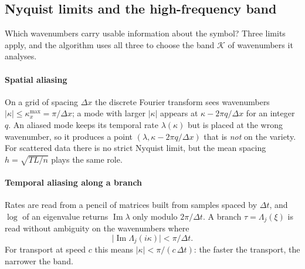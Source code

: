 \documentclass[11pt]{article}
\theoremstyle{plain}
\theoremstyle{definition}
\theoremstyle{remark}
\newcommand{\abs}[1]{\lvert#1\rvert}
\begin{document}
\subsection{Nyquist limits and the high-frequency band}\label{sec:nyquist}
Which wavenumbers carry usable information about the symbol? Three limits apply, and the algorithm
uses all three to choose the band $\mathcal K$ of wavenumbers it analyses.

\paragraph{Spatial aliasing} On a grid of spacing $\Delta x$ the discrete Fourier transform sees
wavenumbers $\abs{\kappa}\le\kappa_x^{\max}=\pi/\Delta x$; a mode with larger $\abs\kappa$ appears at
$\kappa-2\pi q/\Delta x$ for an integer $q$. An aliased mode keeps its temporal rate $\lambda(\kappa)$
but is placed at the wrong wavenumber, so it produces a point $(\lambda,\kappa-2\pi q/\Delta x)$ that is
\emph{not} on the variety. For scattered data there is no strict Nyquist limit, but the mean spacing
$h=\sqrt{TL/n}$ plays the same role.

\paragraph{Temporal aliasing along a branch} Rates are read from a pencil of matrices built from
samples spaced by $\Delta t$, and $\log$ of an eigenvalue returns $\operatorname{Im}\lambda$ only modulo
$2\pi/\Delta t$. A branch $\tau=\Lambda_j(\xi)$ is read without ambiguity on the wavenumbers where
\begin{equation}\label{eq:nyq-t}
  \abs{\operatorname{Im}\Lambda_j(i\kappa)}<\pi/\Delta t .
\end{equation}
For transport at speed $c$ this means $\abs\kappa<\pi/(c\,\Delta t)$: the faster the transport, the
narrower the band.
\end{document}
